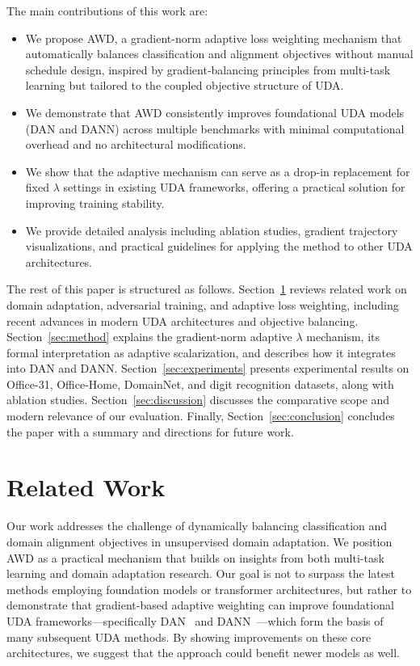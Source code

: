 \documentclass[pdflatex,sn-mathphys-num]{sn-jnl}
\theoremstyle{thmstyleone}
\theoremstyle{thmstyletwo}
\theoremstyle{thmstylethree}
\begin{document}
The main contributions of this work are:
\begin{itemize}
    \item We propose AWD, a gradient-norm adaptive loss weighting mechanism that automatically balances classification and alignment objectives without manual schedule design, inspired by gradient-balancing principles from multi-task learning but tailored to the coupled objective structure of UDA.
    \item We demonstrate that AWD consistently improves foundational UDA models (DAN and DANN) across multiple benchmarks with minimal computational overhead and no architectural modifications.
    \item We show that the adaptive mechanism can serve as a drop-in replacement for fixed $\lambda$ settings in existing UDA frameworks, offering a practical solution for improving training stability.
    \item We provide detailed analysis including ablation studies, gradient trajectory visualizations, and practical guidelines for applying the method to other UDA architectures.
\end{itemize}

The rest of this paper is structured as follows. Section~\ref{sec:related} reviews related work on domain adaptation, adversarial training, and adaptive loss weighting, including recent advances in modern UDA architectures and objective balancing. Section~\ref{sec:method} explains the gradient-norm adaptive $\lambda$ mechanism, its formal interpretation as adaptive scalarization, and describes how it integrates into DAN and DANN. Section~\ref{sec:experiments} presents experimental results on Office-31, Office-Home, DomainNet, and digit recognition datasets, along with ablation studies. Section~\ref{sec:discussion} discusses the comparative scope and modern relevance of our evaluation. Finally, Section~\ref{sec:conclusion} concludes the paper with a summary and directions for future work.


\section{Related Work}
\label{sec:related}

Our work addresses the challenge of dynamically balancing classification and domain alignment objectives in unsupervised domain adaptation. We position AWD as a practical mechanism that builds on insights from both multi-task learning and domain adaptation research. Our goal is not to surpass the latest methods employing foundation models or transformer architectures, but rather to demonstrate that gradient-based adaptive weighting can improve foundational UDA frameworks---specifically DAN~\cite{long2015dan} and DANN~\cite{ganin2016dann}---which form the basis of many subsequent UDA methods. By showing improvements on these core architectures, we suggest that the approach could benefit newer models as well.
\end{document}
